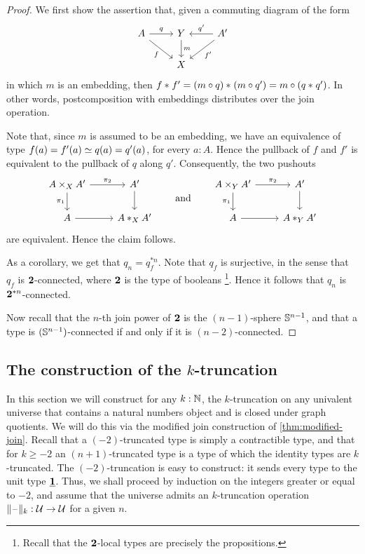 \begin{proof}
We first show the assertion that, given a commuting diagram of the form
\begin{equation*}
\begin{tikzcd}
A \arrow[r,"q"] \arrow[dr,swap,"f"] & Y \arrow[d,"m"] & A' \arrow[l,swap,"{q'}"] \arrow[dl,"{f'}"] \\
& X
\end{tikzcd}
\end{equation*}
in which $m$ is an embedding, then ${f}\ast_{}{f'}={(m\circ q)}\ast_{}{(m\circ q')}=m\circ ({q}\ast_{}{q'})$.
In other words, postcomposition with embeddings distributes over 
the join operation.

Note that, since $m$ is assumed to be an embedding, we have an equivalence of
type $\eqv{f(a)=f'(a)}{q(a)=q'(a)}$, for every $a:A$. Hence the pullback of
$f$ and $f'$ is equivalent to the pullback of $q$ along $q'$. Consequently, the
two pushouts
\begin{equation*}
\begin{tikzcd}
A\times_X A' \arrow[r,"\pi_2"] \arrow[d,swap,"\pi_1"] & A' \arrow[d] \\
A \arrow[r] & \join[X]{A}{A'}
\end{tikzcd}
\qquad\text{and}\qquad
\begin{tikzcd}
A\times_Y A' \arrow[r,"\pi_2"] \arrow[d,swap,"\pi_1"] & A' \arrow[d] \\
A \arrow[r] & \join[Y]{A}{A'}
\end{tikzcd}
\end{equation*}
are equivalent. Hence the claim follows.

As a corollary, we get that $q_n=q_f^{\ast n}$. Note that $q_f$ is surjective,
in the sense that $q_f$ is $\mathbf{2}$-connected, where $\mathbf{2}$ is the type of booleans%
\footnote{Recall that the $\mathbf{2}$-local types are precisely the propositions.}.
Hence it follows that $q_n$ is $\mathbf{2}^{\ast n}$-connected. 

Now recall that the $n$-th join power of $\mathbf{2}$ is the $(n-1)$-sphere $\mathbb{S}^{n-1}$, and that
a type is $(\mathbb{S}^{n-1})$-connected if and only if it is $(n-2)$-connected.
\end{proof}

\subsection{The construction of the $k$-truncation}\label{sec:truncation}

In this section we will construct for any $k:\mathbb{N}$, the $k$-truncation on any univalent universe that contains
a natural numbers object and is closed under graph quotients.
We will do this via the modified join construction of \autoref{thm:modified-join}.
Recall that a $(-2)$-truncated type is simply a contractible type, and that
for $k\geq -2$ an $(n+1)$-truncated type is a type of which the identity types
are $k$-truncated. The $(-2)$-truncation is easy to construct: it sends
every type to the unit type $\underline{\mathbf{1}}$. Thus, we shall proceed by induction
on the integers greater or equal to $-2$, and assume that the universe admits
an $k$-truncation operation $\Vert \mathord{\hspace{1pt}\text{--}\hspace{1pt}}\Vert_{k}:\mathcal{U}\to\mathcal{U}$ for a given $n$.

